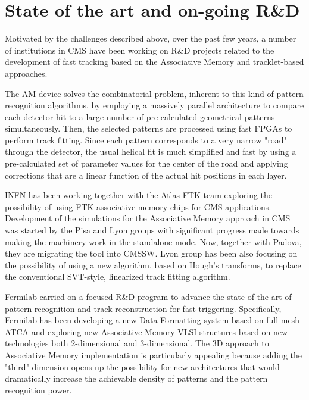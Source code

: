 \section{State of the art and on-going R\&D}

\noindent Motivated by the challenges described above, over the past few years, a number of institutions in CMS have been working on R\&D projects related to the development of fast tracking based on the Associative Memory and tracklet-based approaches.

\noindent The AM device solves the combinatorial problem, inherent to this kind of pattern recognition algorithms, by employing a massively parallel architecture to compare each detector hit to a large number of pre-calculated geometrical patterns simultaneously. Then, the selected patterns are processed using fast FPGAs to perform track fitting. Since each pattern corresponds to a very narrow "road" through the detector, the usual helical fit is much simplified and fast by using a pre-calculated set of parameter values for the center of the road and applying corrections that are a linear function of the actual hit positions in each layer. 

\noindent INFN has been working together with the Atlas FTK team exploring the possibility of using FTK associative memory chips for CMS applications. Development of the simulations for the Associative Memory approach in CMS was started by the Pisa and Lyon groups with significant progress made towards making the machinery work in the standalone mode. Now, together with Padova, they are migrating the tool into CMSSW. Lyon group has been also focusing on the possibility of using a new algorithm, based on Hough's transforms, to replace the conventional SVT-style, linearized track fitting algorithm. 

\noindent Fermilab carried on a focused R\&D program to advance the state-of-the-art of pattern recognition and track reconstruction for fast triggering. Specifically, Fermilab has been developing a new Data Formatting system based on full-mesh ATCA and exploring new Associative Memory VLSI structures based on new technologies both 2-dimensional and 3-dimensional. The 3D approach to Associative Memory implementation is particularly appealing because adding the "third" dimension opens up the possibility for new architectures that would dramatically increase the achievable density of patterns and the pattern recognition power. 

